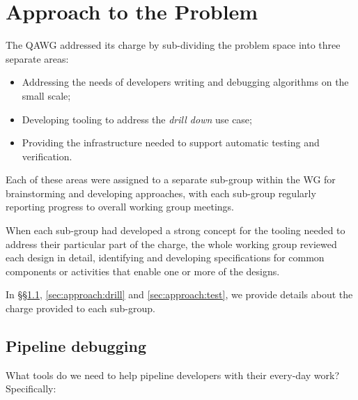 \section{Approach to the Problem}
\label{sec:approach}


The QAWG addressed its charge by sub-dividing the problem space into three separate areas:

\begin{itemize}

  \item{Addressing the needs of developers writing and debugging algorithms on the small scale;}
  \item{Developing tooling to address the \textit{\gls{drill down}} use case;}
  \item{Providing the infrastructure needed to support automatic testing and verification.}

\end{itemize}

Each of these areas were assigned to a separate sub-group within the WG for
brainstorming and developing approaches, with each sub-group regularly
reporting progress to overall working group meetings.

When each sub-group had developed a strong concept for the tooling needed to
address their particular part of the charge, the whole working group reviewed
each design in detail, identifying and developing specifications for common
components or activities that enable one or more of the designs.

In \S\S\ref{sec:approach:debug}, \ref{sec:approach:drill} and
\ref{sec:approach:test}, we provide details about the charge provided to each
sub-group.

\subsection{Pipeline debugging}
\label{sec:approach:debug}


What tools do we need to help pipeline developers with their every-day work?
Specifically:

